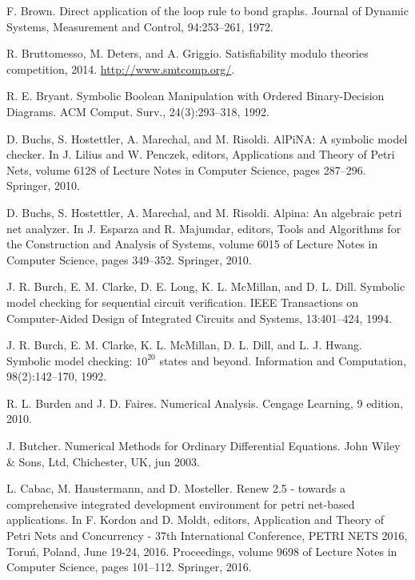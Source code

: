 \begin{description}[style=nextline,leftmargin=12mm,labelwidth=10mm,font=\normalfont]
\item[{[53]}] F. Brown. Direct application of the loop rule to bond graphs. Journal of Dynamic Systems, Measurement and Control, 94:253–261, 1972.

\item[{[54]}] R. Bruttomesso, M. Deters, and A. Griggio. Satisfiability modulo theories competition, 2014. \url{http://www.smtcomp.org/}.

\item[{[55]}] R. E. Bryant. Symbolic Boolean Manipulation with Ordered Binary-Decision Diagrams. ACM Comput. Surv., 24(3):293–318, 1992.

\item[{[56]}] D. Buchs, S. Hostettler, A. Marechal, and M. Risoldi. AlPiNA: A symbolic model checker. In J. Lilius and W. Penczek, editors, Applications and Theory of Petri Nets, volume 6128 of Lecture Notes in Computer Science, pages 287–296. Springer, 2010.

\item[{[57]}] D. Buchs, S. Hostettler, A. Marechal, and M. Risoldi. Alpina: An algebraic petri net analyzer. In J. Esparza and R. Majumdar, editors, Tools and Algorithms for the Construction and Analysis of Systems, volume 6015 of Lecture Notes in Computer Science, pages 349–352. Springer, 2010.

\item[{[58]}] J. R. Burch, E. M. Clarke, D. E. Long, K. L. McMillan, and D. L. Dill. Symbolic model checking for sequential circuit verification. IEEE Transactions on Computer-Aided Design of Integrated Circuits and Systems, 13:401–424, 1994.

\item[{[59]}] J. R. Burch, E. M. Clarke, K. L. McMillan, D. L. Dill, and L. J. Hwang. Symbolic model checking: $10^{20}$ states and beyond. Information and Computation, 98(2):142–170, 1992.

\item[{[60]}] R. L. Burden and J. D. Faires. Numerical Analysis. Cengage Learning, 9 edition, 2010.

\item[{[61]}] J. Butcher. Numerical Methods for Ordinary Differential Equations. John Wiley \& Sons, Ltd, Chichester, UK, jun 2003.

\item[{[62]}] L. Cabac, M. Haustermann, and D. Mosteller. Renew 2.5 - towards a comprehensive integrated development environment for petri net-based applications. In F. Kordon and D. Moldt, editors, Application and Theory of Petri Nets and Concurrency - 37th International Conference, PETRI NETS 2016, Toruń, Poland, June 19-24, 2016. Proceedings, volume 9698 of Lecture Notes in Computer Science, pages 101–112. Springer, 2016.


\end{description}
